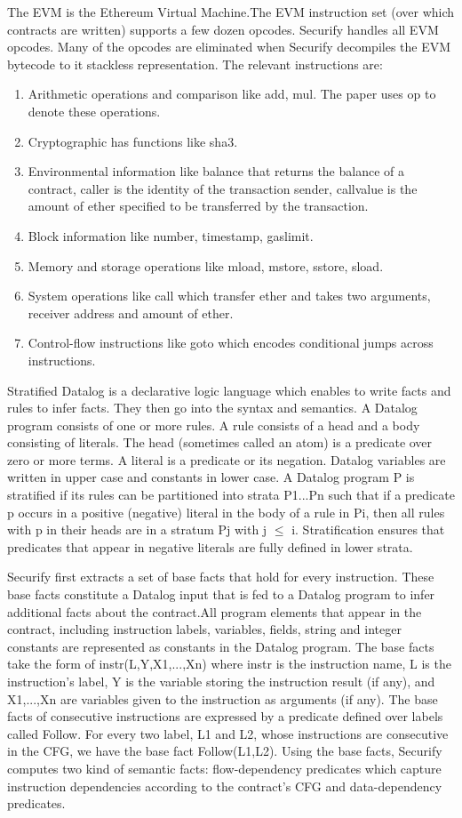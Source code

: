\documentclass{article}
\begin{document}
The EVM is the Ethereum Virtual Machine.The EVM instruction set (over which contracts are written) supports a few dozen opcodes. Securify handles all EVM opcodes. Many of the opcodes are eliminated when Securify decompiles the EVM bytecode to it stackless representation. The relevant instructions are:
\begin{enumerate}
    \item Arithmetic operations and comparison like add, mul. The paper uses op to denote these operations.
    \item Cryptographic has functions like sha3.
    \item Environmental information like balance that returns the balance of a contract, caller is the identity of the transaction sender, callvalue is the amount of ether specified to be transferred by the transaction.
    \item Block information like number, timestamp, gaslimit.
    \item Memory and storage operations like mload, mstore, sstore, sload.
    \item System operations like call which transfer ether and takes two arguments, receiver address and amount of ether.
    \item Control-flow instructions like goto which encodes conditional jumps across instructions.
\end{enumerate}
Stratified Datalog is a declarative logic language which enables to write facts and rules to infer facts. They then go into the syntax and semantics. A Datalog program consists of one or more rules. A rule consists of a head and a body consisting of literals. The head (sometimes called an atom) is a predicate over zero or more terms. A literal is a predicate or its negation. Datalog variables are written in upper case and constants in lower case. A Datalog program P is stratified if its rules can be partitioned into strata P1...Pn such that if a predicate p occurs in a positive (negative) literal in the body of a rule in Pi, then all rules with p in their heads are in a stratum Pj with j $\leq$ i. Stratification ensures that predicates that appear in negative literals are fully defined in lower strata.

Securify first extracts a set of base facts that hold for every instruction. These base facts constitute a Datalog input that is fed to a Datalog program to infer additional facts about the contract.All program elements that appear in the contract, including instruction labels, variables, fields, string and integer constants are represented as constants in the Datalog program. The base facts take the form of instr(L,Y,X1,...,Xn) where instr is the instruction name, L is the instruction's label, Y is the variable storing the instruction result (if any), and X1,...,Xn are variables given to the instruction as arguments (if any). The base facts of consecutive instructions are expressed by a predicate defined over labels called Follow. For every two label, L1 and L2, whose instructions are consecutive in the CFG, we have the base fact Follow(L1,L2). Using the base facts, Securify computes two kind of semantic facts: flow-dependency predicates which capture instruction dependencies according to the contract's CFG and data-dependency predicates.
\end{document}
